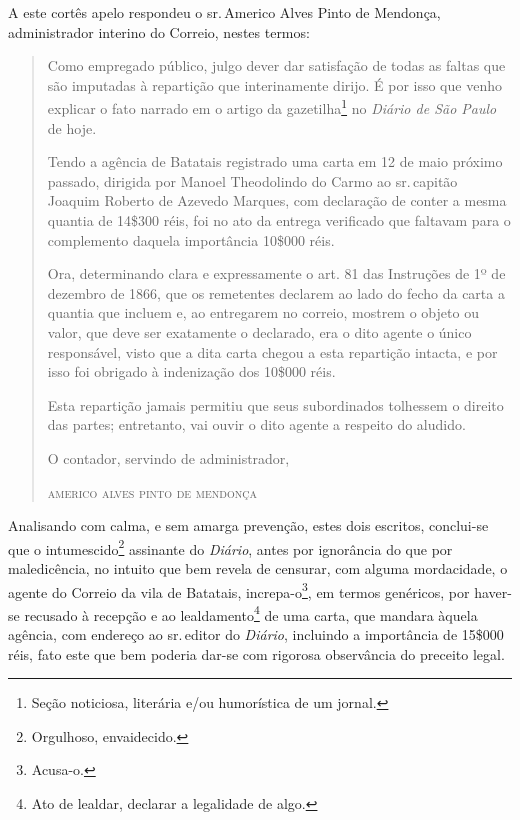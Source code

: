 A este cortês apelo respondeu o sr.\,Americo Alves Pinto de Mendonça,
administrador interino do Correio, nestes termos:

\begin{quote}
Como empregado público, julgo dever dar satisfação de todas as faltas
que são imputadas à repartição que interinamente dirijo. É por isso que
venho explicar o fato narrado em o artigo da gazetilha\footnote{Seção
  noticiosa, literária e/ou humorística de um jornal.} no \emph{Diário
de São Paulo} de hoje.

Tendo a agência de Batatais registrado uma carta em 12 de maio próximo
passado, dirigida por Manoel Theodolindo do Carmo ao sr.\,capitão Joaquim
Roberto de Azevedo Marques, com declaração de conter a mesma quantia de
14\$300 réis, foi no ato da entrega verificado que faltavam para o
complemento daquela importância 10\$000 réis.

Ora, determinando clara e expressamente o art. 81 das Instruções de 1º
de dezembro de 1866, que os remetentes declarem ao lado do fecho da
carta a quantia que incluem e, ao entregarem no correio, mostrem o
objeto ou valor, que deve ser exatamente o declarado, era o dito agente
o único responsável, visto que a dita carta chegou a esta repartição
intacta, e por isso foi obrigado à indenização dos 10\$000 réis.

Esta repartição jamais permitiu que seus subordinados tolhessem o
direito das partes; entretanto, vai ouvir o dito agente a respeito do
aludido.

O contador, servindo de administrador,

\begin{flushright}
\textsc{americo alves pinto de mendonça}
\end{flushright}
\end{quote}

Analisando com calma, e sem amarga prevenção, estes dois escritos,
conclui-se que o intumescido\footnote{Orgulhoso, envaidecido.}
assinante do \emph{Diário}, antes por ignorância do que por
maledicência, no intuito que bem revela de censurar, com alguma
mordacidade, o agente do Correio da vila de Batatais,
increpa-o\footnote{Acusa-o.}, em termos genéricos, por haver-se
recusado à recepção e ao lealdamento\footnote{Ato de lealdar, declarar
  a legalidade de algo.} de uma carta, que mandara àquela agência, com
endereço ao sr.\,editor do \emph{Diário}, incluindo a importância de
15\$000 réis, fato este que bem poderia dar-se com rigorosa observância
do preceito legal.

